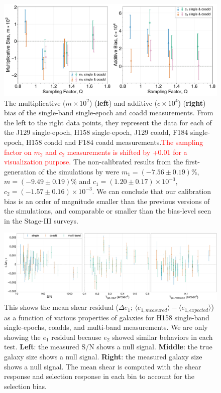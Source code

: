 \documentclass[fleqn,usenatbib]{mnras}
\begin{document}
\begin{figure}
	\includegraphics[width=\textwidth]{final_result_v4_pplt.pdf}
    \caption{The multiplicative ($m \times 10^2$) (\textbf{left}) and additive ($c \times 10^4$) (\textbf{right}) bias of the single-band single-epoch and coadd measurements. From the left to the right data points, they represent the data for each of the J129 single-epoch, H158 single-epoch, J129 coadd, F184 single-epoch, H158 coadd and F184 coadd measurements.\textcolor{red}{The sampling factor on $m_2$ and $c_2$ measurements is shifted by +0.01 for a visualization purpose.} The non-calibrated results from the first-generation of the simulations by \cite{2021MNRAS.501.2044T} were $m_1=(-7.56\pm0.19)\%$, $m=(-9.49\pm0.19)\%$ and $c_1=(1.20\pm0.17)\times10^{-3}$, $c_2=(-1.57\pm0.16)\times10^{-3}$. We can conclude that our calibration bias is an order of magnitude smaller than the previous versions of the simulations, and comparable or smaller than the bias-level seen in the Stage-III surveys.}
    \label{fig:final_result}
\end{figure}

\begin{figure}
    \centering
	\includegraphics[width=\textwidth]{H158_meanshear_measured_properties_perbin_e1_v6_pplt.pdf}
    \caption{This shows the mean shear residual ($\Delta e_{1}$; $\langle e_{1,measured} \rangle - \langle e_{1,expected} \rangle$) as a function of various properties of galaxies for H158 single-band single-epochs, coadds, and multi-band measurements. We are only showing the $e_1$ residual because $e_{2}$ showed similar behaviors in each test. \textbf{Left}: the measured S/N shows a null signal. \textbf{Middle}: the true galaxy size shows a null signal. \textbf{Right}: the measured galaxy size shows a null signal. The mean shear is computed with the shear response and selection response in each bin to account for the selection bias.}
    \label{fig:meanshear}
\end{figure}
\end{document}
